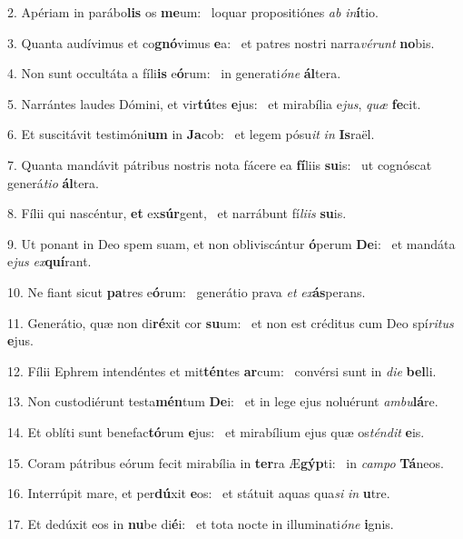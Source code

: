2. Apériam in parábo\textbf{lis} os \textbf{me}um: \ast\  loquar propositiónes \textit{ab} \textit{in}\textbf{í}tio.\

3. Quanta audívimus et co\textbf{gnó}vimus \textbf{e}a: \ast\  et patres nostri narra\textit{vé}\textit{runt} \textbf{no}bis.\

4. Non sunt occultáta a fíli\textbf{is} e\textbf{ó}rum: \ast\  in generati\textit{ó}\textit{ne} \textbf{ál}tera.\

5. Narrántes laudes Dómini, et vir\textbf{tú}tes \textbf{e}jus: \ast\  et mirabília e\textit{jus}, \textit{quæ} \textbf{fe}cit.\

6. Et suscitávit testimóni\textbf{um} in \textbf{Ja}cob: \ast\  et legem pósu\textit{it} \textit{in} \textbf{Is}raël.\

7. Quanta mandávit pátribus nostris nota fácere ea \textbf{fí}liis \textbf{su}is: \ast\  ut cognóscat generá\textit{ti}\textit{o} \textbf{ál}tera.\

8. Fílii qui nascéntur, \textbf{et} ex\textbf{súr}gent, \ast\  et narrábunt fí\textit{li}\textit{is} \textbf{su}is.\

9. Ut ponant in Deo spem suam, et non obliviscántur \textbf{ó}perum \textbf{De}i: \ast\  et mandáta e\textit{jus} \textit{ex}\textbf{quí}rant.\

10. Ne fiant sicut \textbf{pa}tres e\textbf{ó}rum: \ast\  generátio prava \textit{et} \textit{ex}\textbf{ás}perans.\

11. Generátio, quæ non di\textbf{ré}xit cor \textbf{su}um: \ast\  et non est créditus cum Deo spí\textit{ri}\textit{tus} \textbf{e}jus.\

12. Fílii Ephrem intendéntes et mit\textbf{tén}tes \textbf{ar}cum: \ast\  convérsi sunt in \textit{di}\textit{e} \textbf{bel}li.\

13. Non custodiérunt testa\textbf{mén}tum \textbf{De}i: \ast\  et in lege ejus noluérunt \textit{am}\textit{bu}\textbf{lá}re.\

14. Et oblíti sunt benefac\textbf{tó}rum \textbf{e}jus: \ast\  et mirabílium ejus quæ os\textit{tén}\textit{dit} \textbf{e}is.\

15. Coram pátribus eórum fecit mirabília in \textbf{ter}ra Æ\textbf{gýp}ti: \ast\  in \textit{cam}\textit{po} \textbf{Tá}neos.\

16. Interrúpit mare, et per\textbf{dú}xit \textbf{e}os: \ast\  et státuit aquas qua\textit{si} \textit{in} \textbf{u}tre.\

17. Et dedúxit eos in \textbf{nu}be di\textbf{é}i: \ast\  et tota nocte in illuminati\textit{ó}\textit{ne} \textbf{i}gnis.\

